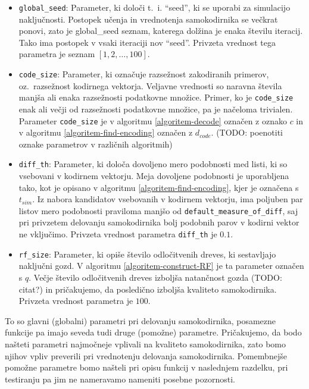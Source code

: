 \documentclass[12pt,a4paper,twoside]{article}
\theoremstyle{definition} %
\theoremstyle{plain} %
\numberwithin{equation}{section}  %
\begin{document}
\begin{itemize}
	\item \texttt{global\_seed}: Parameter, ki določi t.~i. ``seed'', ki se uporabi za simulacijo naključnosti.
	Postopek učenja in vrednotenja samokodirnika se večkrat ponovi, zato je global\_seed seznam, katerega dolžina je enaka številu iteracij.
	Tako ima postopek v vsaki iteraciji nov ``seed''. 
	Privzeta vrednost tega parametra je seznam $[1,2,\ldots,100]$.

	\item \texttt{code\_size}: Parameter, ki označuje razsežnost zakodiranih primerov, oz.\ razsežnost kodirnega vektorja. 
	Veljavne vrednosti so naravna števila manjša ali enaka razsežnosti podatkovne množice.
	Primer, ko je \texttt{code\_size} enak ali večji od razsežnosti podatkovne množice, pa je načeloma trivialen.
	Parameter \texttt{code\_size} je v algoritmu \ref{algoritem-decode} označen z oznako $c$ in v algoritmu \ref{algoritem-find-encoding} označen z $d_{code}$. 
	(TODO: poenotiti oznake parametrov v različnih algoritmih)
	
	\item \texttt{diff\_th}: Parameter, ki določa dovoljeno mero podobnosti med listi, ki so vsebovani v kodirnem vektorju.
	Meja dovoljene podobnosti je uporabljena tako, kot je opisano v algoritmu \ref{algoritem-find-encoding}, kjer je označena s $t_{\mathit{sim}}$.
	Iz nabora kandidatov vsebovanih v kodirnem vektorju, ima poljuben par listov mero podobnosti praviloma manjšo od \texttt{default\_\-measure\_\-of\_\-diff}, 
	saj pri privzetem delovanju samokodirnika bolj podobnih parov v kodirni vektor ne vključimo.
	Privzeta vrednost parametra \texttt{diff\_th} je $0.1$. %

	\item \texttt{rf\_size}: Parameter, ki opiše število odločitvenih dreves, ki sestavljajo naključni gozd. 
	V algoritmu \ref{algoritem-construct-RF} je ta parameter označen s $q$. 
	Večje število odločitvenih dreves izboljša natančnost gozda (TODO: citat?) in pričakujemo, da posledično izboljša kvaliteto samokodirnika.
	Privzeta vrednost parametra je $100$.

\end{itemize}

To so glavni (globalni) parametri pri delovanju samokodirnika, posamezne funkcije pa imajo seveda tudi druge (pomožne) parametre.
Pričakujemo, da bodo našteti parametri najmočneje vplivali na kvaliteto samokodirnika, zato bomo njihov vpliv preverili pri vrednotenju delovanja samokodirnika. 
Pomembnejše pomožne parametre bomo našteli pri opisu funkcij v naslednjem razdelku, pri testiranju pa jim ne nameravamo nameniti posebne pozornosti.
\end{document}
